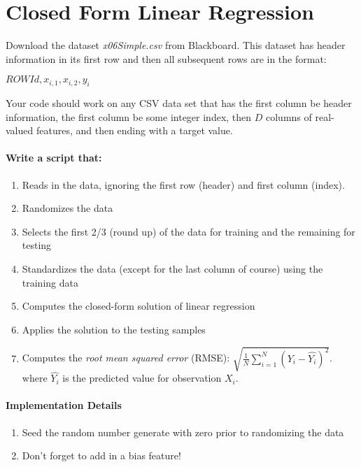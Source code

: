 \documentclass[12pt]{article}
\begin{document}
\newpage
\section{Closed Form Linear Regression}\label{linreg}
Download the dataset \emph{x06Simple.csv} from Blackboard.  This dataset has header information in its first row and then all subsequent rows are in the format:
\begin{center}
$ROWId, x_{i,1}, x_{i,2}, y_i$
\end{center}
Your code should work on any CSV data set that has the first column be header information, the first column be some integer index, then $D$ columns of real-valued features, and then ending with a target value.\\

\noindent
\paragraph{Write a script that:}
\begin{enumerate}
  \item Reads in the data, ignoring the first row (header) and first column (index).
  \item Randomizes the data
  \item Selects the first 2/3 (round up) of the data for training and the remaining for testing
  \item Standardizes the data (except for the last column of course) using the training data
  \item Computes the closed-form solution of linear regression
  \item Applies the solution to the testing samples
 \item Computes the \emph{root mean squared error} (RMSE): $\sqrt{\frac{1}{N}\sum_{i=1}^N (Y_i-\hat{Y_i})^2}$. where $\hat{Y_i}$ is the predicted value for observation $X_i$.
\end{enumerate}


\paragraph{Implementation Details}
\begin{enumerate}
\item Seed the random number generate with zero prior to randomizing the data
\item Don't forget to add in a bias feature!
\end{enumerate}
\end{document}
